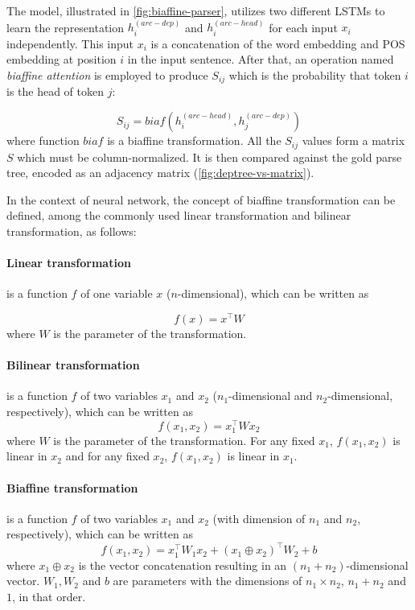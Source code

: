 The model, illustrated in \cref{fig:biaffine-parser}, utilizes two different LSTMs to learn the representation $h^{(arc-dep)}_i$ and $h^{(arc-head)}_i$ for each input $x_i$ independently. This input $x_i$ is a concatenation of the word embedding and POS embedding at position $i$ in the input sentence.
After that, an operation named \textit{biaffine attention} is employed to produce $S_{ij}$ which is the probability that token $i$ is the head of token $j$:

\begin{equation}
    S_{ij} = biaf(h^{(arc-head)}_i, h^{(arc-dep)}_j)    
\end{equation}
where function $biaf$ is a biaffine transformation. All the $S_{ij}$ values form a matrix $S$ which must be column-normalized.
It is then compared against the gold parse tree, encoded as an adjacency matrix (\cref{fig:deptree-vs-matrix}).

In the context of neural network, the concept of biaffine transformation can be defined, among the commonly used linear transformation and bilinear transformation, as follows:

\paragraph{Linear transformation} is a function $f$ of one variable $x$ ($n$-dimensional), which can be written as 

\begin{equation}
    f(x)=x^\top W
\end{equation}
where $W$ is the parameter of the transformation.

\paragraph{Bilinear transformation} is a function $f$ of two variables $x_1$ and $x_2$ ($n_1$-dimensional and $n_2$-dimensional, respectively), which can be written as 
\begin{equation}
    f(x_1, x_2)=x_1^\top W x_2
\end{equation}
where $W$ is the parameter of the transformation. For any fixed $x_1$, $f(x_1, x_2)$ is linear in $x_2$ and for any fixed $x_2$, $f(x_1, x_2)$ is linear in $x_1$.

\paragraph{Biaffine transformation} is a function $f$ of two variables $x_1$ and $x_2$ (with dimension of $n_1$ and $n_2$, respectively), which can be written as 
\begin{equation}
    f(x_1, x_2) = x_1^\top W_1 x_2 + (x_1\oplus x_2)^\top W_2 + b
\end{equation}
where $x_1 \oplus x_2 $ is the vector concatenation resulting in an $(n_1+n_2)$-dimensional vector. $W_1, W_2$ and $b$ are parameters with the dimensions of $n_1\times n_2$, $n_1+n_2$ and $1$, in that order.

